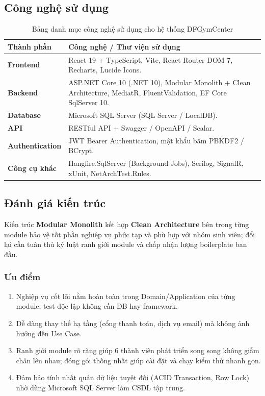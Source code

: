 \documentclass[a4paper,12pt]{article}
\begin{document}
\subsection{Công nghệ sử dụng}

\begin{table}[H]
\centering
\begin{tabularx}{\textwidth}{|L{3.8cm}|Y|}
\hline
\textbf{Thành phần} & \textbf{Công nghệ / Thư viện sử dụng} \\ \hline
\textbf{Frontend} & React 19 + TypeScript, Vite, React Router DOM 7, Recharts, Lucide Icons. \\ \hline
\textbf{Backend} & ASP.NET Core 10 (.NET 10), Modular Monolith + Clean Architecture, MediatR, FluentValidation, EF Core SqlServer 10. \\ \hline
\textbf{Database} & Microsoft SQL Server (SQL Server / LocalDB). \\ \hline
\textbf{API} & RESTful API + Swagger / OpenAPI / Scalar. \\ \hline
\textbf{Authentication} & JWT Bearer Authentication, mật khẩu băm PBKDF2 / BCrypt. \\ \hline
\textbf{Công cụ khác} & Hangfire.SqlServer (Background Jobs), Serilog, SignalR, xUnit, NetArchTest.Rules. \\ \hline
\end{tabularx}
\caption{Bảng danh mục công nghệ sử dụng cho hệ thống DFGymCenter}
\end{table}

\subsection{Đánh giá kiến trúc}
Kiến trúc \textbf{Modular Monolith} kết hợp \textbf{Clean Architecture} bên trong từng module bảo vệ tốt phần nghiệp vụ phức tạp và phù hợp với nhóm sinh viên; đổi lại cần tuân thủ kỷ luật ranh giới module và chấp nhận lượng boilerplate ban đầu.

\subsubsection{Ưu điểm}
\begin{enumerate}
    \item Nghiệp vụ cốt lõi nằm hoàn toàn trong Domain/Application của từng module, test độc lập không cần DB hay framework.
    \item Dễ dàng thay thế hạ tầng (cổng thanh toán, dịch vụ email) mà không ảnh hưởng đến Use Case.
    \item Ranh giới module rõ ràng giúp 6 thành viên phát triển song song không giẫm chân lên nhau; đóng gói thống nhất giúp cài đặt và chạy kiểm thử nhanh gọn.
    \item Đảm bảo tính nhất quán dữ liệu tuyệt đối (ACID Transaction, Row Lock) nhờ dùng Microsoft SQL Server làm CSDL tập trung.
\end{enumerate}
\end{document}
